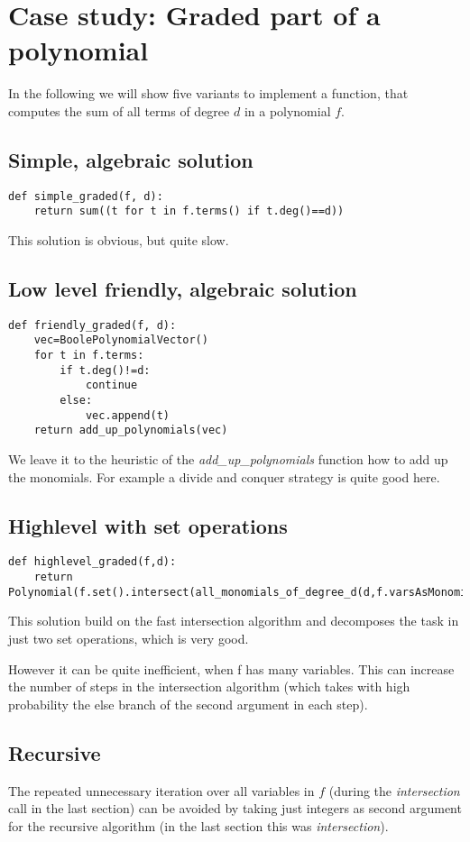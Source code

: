 \documentclass[]{article}
\newcommand{\functionname}[1]{\textit{#1}\xspace}
\newcounter{thm}
\begin{document}
\section{Case study: Graded part of a polynomial}
In the following we will show five variants to implement a function, that computes the sum of all terms of degree $d$ in a polynomial $f$.

\subsection{Simple, algebraic solution}
\begin{verbatim}
def simple_graded(f, d):
    return sum((t for t in f.terms() if t.deg()==d))   
\end{verbatim}
This solution is obvious, but quite slow.

\subsection{Low level friendly, algebraic solution}
\begin{verbatim}
def friendly_graded(f, d):
    vec=BoolePolynomialVector()
    for t in f.terms:
        if t.deg()!=d:
            continue
        else:
            vec.append(t)
    return add_up_polynomials(vec)
\end{verbatim}
We leave it to the heuristic of the \functionname{add\_up\_polynomials} function how to add up the monomials. For example a divide and conquer strategy is quite good here.

\subsection{Highlevel with set operations}
\begin{verbatim}
def highlevel_graded(f,d):
    return Polynomial(f.set().intersect(all_monomials_of_degree_d(d,f.varsAsMonomial())))
\end{verbatim}
This solution build on the fast intersection algorithm and decomposes the task in just two set operations, which is very good.

However it can be quite inefficient, when f has many variables.
This can increase the number of steps in the intersection algorithm (which takes with high probability the else branch of the second argument in each step).

\subsection{Recursive}
The repeated unnecessary iteration over all variables in $f$ (during the \functionname{intersection} call in the last section) can be avoided by taking just integers as second argument for the recursive algorithm (in the last section this was \functionname{intersection}).
\end{document}
